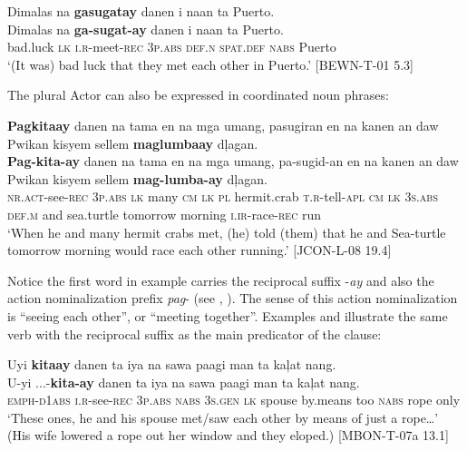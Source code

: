 \ea
\label{bkm:Ref414723974}  
Dimalas  na  \textbf{gasugatay}  danen  i  naan  ta  Puerto. \\\smallskip
\gll Dimalas  na  \textbf{ga-sugat-ay}  danen  i  naan  ta  Puerto. \\
  bad.luck  \textsc{lk}  \textsc{i.r}-meet-\textsc{rec}  3\textsc{p.abs}  \textsc{def.n}  \textsc{spat.def}  \textsc{nabs}  Puerto \\
\glt  ‘(It was) bad luck that they met each other in Puerto.’ [BEWN-T-01 5.3]
\z


The plural Actor can also be expressed in coordinated noun phrases:

\newpage

\ea
\label{bkm:Ref414775363}
\textbf{Pagkitaay}  danen  na  tama  en  na  mga  umang,  pasugiran  en  na  kanen  an  daw  Pwikan  kisyem  sellem  \textbf{maglumbaay}  dļagan.\\\smallskip
\gll \textbf{Pag-kita-ay}  danen  na  tama  en  na  mga  umang,  pa-sugid-an  en  na  kanen  an  daw  Pwikan  kisyem  sellem  \textbf{mag-lumba-ay}  dļagan. \\
\textsc{nr.act}-see-\textsc{rec}  3\textsc{p.abs}  \textsc{lk}  many  \textsc{cm}  \textsc{lk}  \textsc{pl}  hermit.crab \textsc{t.r}-tell-\textsc{apl} \textsc{cm}  \textsc{lk} 3\textsc{s.abs}  \textsc{def.m}  and  sea.turtle  tomorrow  morning  \textsc{i.ir}-race-\textsc{rec}  run \\
\glt `When he and many hermit crabs met, (he) told (them) that he and Sea-turtle tomorrow morning would race each other running.’ [JCON-L-08 19.4]
\z

Notice the first word in example  carries the reciprocal suffix -\textit{ay} and also the action nominalization prefix \textit{pag}{}- (see , ). The sense of this action nominalization is “seeing each other”, or “meeting together”. Examples  and  illustrate the same verb with the reciprocal suffix as the main predicator of the clause:

\ea
  \label{bkm:Ref501776847}
Uyi  \textbf{kitaay}  danen  ta  iya  na  sawa  paagi  man   ta  kaļat  nang. \\\smallskip
\gll U-yi  ...-\textbf{kita-ay}  danen  ta  iya  na  sawa  paagi  man   ta  kaļat  nang. \\
\textsc{emph-d}1\textsc{abs}  \textsc{i.r}-see-\textsc{rec}  3\textsc{p.abs}  \textsc{nabs}  3\textsc{s.gen}  \textsc{lk}  spouse  by.means  too \textsc{nabs}   rope  only \\
\glt `These ones, he and his spouse met/saw each other by means of just a rope…’ (His wife lowered a rope out her window and they eloped.)  [MBON-T-07a 13.1]
\z

